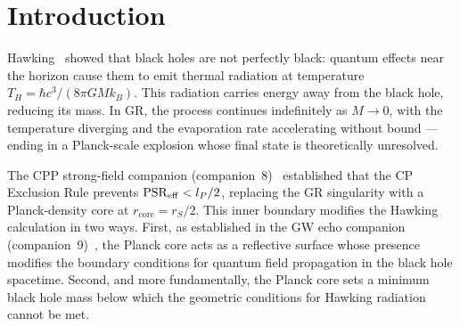 \documentclass[12pt]{article}
\newcommand{\lP}{l_P}
\newcommand{\mP}{m_P}
\newcommand{\rS}{r_S}
\newcommand{\rcore}{r_{\mathrm{core}}}
\newcommand{\PSR}{\mathrm{PSR}}
\newcommand{\TH}{T_H}
\begin{document}
\begin{abstract}
We derive the CPP modifications to Hawking black hole evaporation
resulting from the Planck core established in companion~8.
Standard Hawking radiation proceeds unchanged for $M \gg \mP$.
Evaporation terminates when the Schwarzschild radius reaches
$\rS \sim 2\lP$ — not when the Hawking temperature reaches the Planck
temperature, but when the geometric condition $\rS \gg \lP$ required
by the semiclassical approximation breaks down.
The result is a stable Planck-mass remnant $M_{\rm rem} \sim \mP$
(Proposition~\ref{prop:remnant}).  We show that this remnant is
mechanically stable via a self-sustaining fixed point: gravitational
SSV compression is exactly balanced by CP Exclusion repulsion at
$\PSR_{\rm eff} = \lP/2$ (Proposition~\ref{prop:stability}).
The remnant does not require external pressure and cannot evaporate
further.  We discuss implications for the black hole information paradox
and observable consequences.  No new postulates beyond companion~8 are
required.
\end{abstract}

\section{Introduction}
\label{sec:intro}

Hawking~\cite{hawking1975} showed that black holes are not perfectly
black: quantum effects near the horizon cause them to emit thermal
radiation at temperature $\TH = \hbar c^3/(8\pi G M k_B)$.  This
radiation carries energy away from the black hole, reducing its mass.
In GR, the process continues indefinitely as $M \to 0$, with the
temperature diverging and the evaporation rate accelerating without
bound — ending in a Planck-scale explosion whose final state is
theoretically unresolved.

The CPP strong-field companion (companion~8)~\cite{c8} established
that the CP Exclusion Rule prevents $\PSR_{\rm eff} < \lP/2$,
replacing the GR singularity with a Planck-density core at
$\rcore = \rS/2$.  This inner boundary modifies the Hawking calculation
in two ways.  First, as established in the GW echo companion
(companion~9)~\cite{c9}, the Planck core acts as a reflective surface
whose presence modifies the boundary conditions for quantum field
propagation in the black hole spacetime.  Second, and more
fundamentally, the Planck core sets a minimum black hole mass below
which the geometric conditions for Hawking radiation cannot be met.
\end{document}
